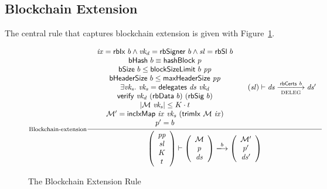 \documentclass[11pt,a4paper]{article}
\newcommand{\var}[1]{\mathit{#1}}
\newcommand{\fun}[1]{\mathsf{#1}}
\newcommand{\size}[1]{\left| #1 \right|}
\newcommand{\trans}[2]{\xlongrightarrow[\textsc{#1}]{#2}}
\newcommand{\hashname}{bHash}
\newcommand{\bsizename}{bSize}
\newcommand{\bhdrsizename}{bHeaderSize}
\newcommand{\verifyname}{verify}
\newcommand{\delegationname}{delegates} %
\newcommand{\signmapname}{\mathcal{M}}
\newcommand{\trimixname}{trimIx}
\newcommand{\incixmapname}{incIxMap}
\newcommand{\hashofblockname}{hashBlock}
\newcommand{\blocksizelimitname}{blockSizeLimit}
\newcommand{\maxheadersizename}{maxHeaderSize}
\newcommand{\rbdataname}{rbData}
\newcommand{\rbcertsname}{rbCerts}
\newcommand{\rbsigname}{rbSig}
\newcommand{\rbixname}{rbIx}
\newcommand{\rbslname}{rbSl}
\newcommand{\rbsignername}{rbSigner}
\newcommand{\verify}[3]{\fun{\verifyname} ~ #1 ~ #2 ~ #3}
\newcommand{\hash}[1]{\fun{\hashname}\ #1}
\newcommand{\bsize}[1]{\fun{\bsizename} ~ #1}
\newcommand{\bhdrsize}[1]{\fun{\bhdrsizename} ~ #1}
\newcommand{\delegation}[2]{\fun{\delegationname} ~ #1 ~ #2}
\newcommand{\signmap}[1]{\fun{\signmapname} ~ #1}
\newcommand{\trimix}[2]{\fun{\trimixname} ~ #1 ~ #2}
\newcommand{\incixmap}[3]{\fun{\incixmapname} ~ #1 ~ #2 ~ #3}
\newcommand{\hashofblock}[1]{\fun{\hashofblockname} ~ #1}
\newcommand{\blocksizelimit}[2]{\fun{\blocksizelimitname} ~ #1 ~ #2}
\newcommand{\maxheadersize}[1]{\fun{\maxheadersizename} ~ #1}
\newcommand{\rbdata}[1]{\fun{\rbdataname} ~ #1}
\newcommand{\rbcerts}[1]{\fun{\rbcertsname} ~ #1}
\newcommand{\rbsig}[1]{\fun{\rbsigname} ~ #1}
\newcommand{\rbix}[1]{\fun{\rbixname} ~ #1}
\newcommand{\rbsl}[1]{\fun{\rbslname} ~ #1}
\newcommand{\rbsigner}[1]{\fun{\rbsignername} ~ #1}
\begin{document}
\subsection{Blockchain Extension}
\label{sec:chain-extension}

The central rule that captures blockchain extension is given with
Figure~\ref{fig:blockchain-extension}.

\begin{figure}
  \begin{equation*}
  \inference[Blockchain-extension]
  {
    {\begin{array}{c}
      \var{ix} = \rbix{b} \wedge \var{vk_d} = \rbsigner{b} \wedge \var{sl} = \rbsl{b} \\
      \hash{b} \equiv \hashofblock{p} \\
      \bsize{b} \leq \blocksizelimit{b}{\var{pp}} \\
      \bhdrsize{b} \leq \maxheadersize{\var{pp}} \\
      \exists \var{\var{vk_s}}.~\var{vk_s} = \delegation{\var{ds}}{\var{vk_d}} \\
      \verify{\var{vk_d}}{(\rbdata{b})}{(\rbsig{b})} \\
      \size{\signmap{\var{vk_s}}} \leq K \cdot t \\
      \signmapname' = \incixmap{\var{ix}}{\var{vk_s}}{(\trimix{\signmapname}{\var{ix}})} \\
      p' = b 
     \end{array}}
   & (\var{sl}) \vdash \var{ds} \trans{\text{DELEG}}{\rbcerts{b}} \var{ds'}
  }
  {
    \left(
      {\begin{array}{c}
         \var{pp} \\
         \var{sl} \\
         K \\
         t
       \end{array}}
    \right)
    \vdash
    \left(
      {\begin{array}{c}
         \signmapname \\
         p \\
         \var{ds}
       \end{array}}
    \right)
    \trans{}{b}
    \left(
      {\begin{array}{c}
         \signmapname' \\
         p' \\
         \var{ds'}
       \end{array}}
    \right)
 }
  \end{equation*}
  \caption{The Blockchain Extension Rule}
  \label{fig:blockchain-extension}
\end{figure}
\end{document}
